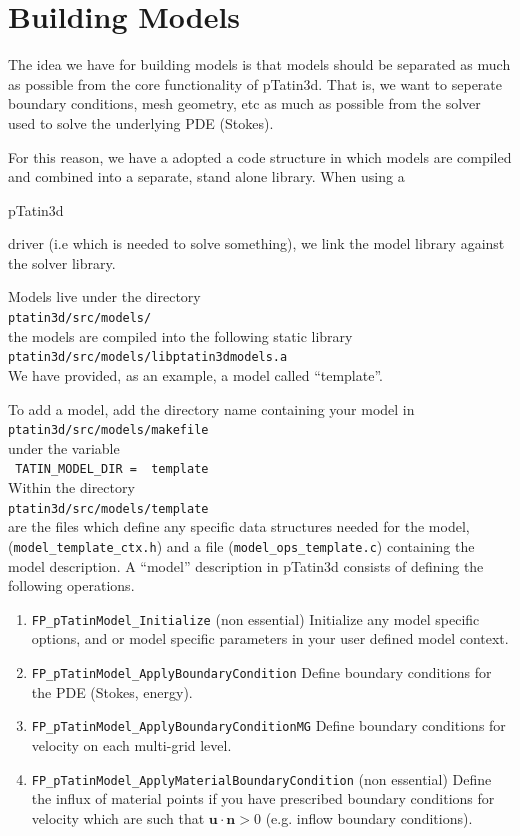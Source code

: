 \documentclass[paper=a4, fontsize=11pt,twoside]{scrartcl}
\newcommand{\ptat}{{pTatin3d}}
\newcommand{\shellcmd}[1]{\\\indent\indent\texttt{\hspace{5mm}\footnotesize #1}\\}
\newcommand{\unix}[1]{\texttt{\footnotesize #1}}
\begin{document}
\newpage
\section{Building Models}

The idea we have for building models is that models should be separated as much as possible
from the core functionality of {\ptat}. That is, we want to seperate boundary conditions,
mesh geometry, etc as much as possible from the solver used to solve the underlying PDE (Stokes).

For this reason, we have a adopted a code structure in which models are compiled and combined into
a separate, stand alone library. When using a {\ptat{ driver (i.e which is needed to solve something),
we link the model library against the solver library.

Models live under the directory
	\shellcmd{ptatin3d/src/models/}
the models are compiled into the following static library
	\shellcmd{ptatin3d/src/models/libptatin3dmodels.a}
	
We have provided, as an example, a model called ``template''.
	
To add a model, add the directory name containing your model in
	\shellcmd{ptatin3d/src/models/makefile}
under the variable
	\shellcmd{
	TATIN\_MODEL\_DIR = \
        template
	}
	
Within the directory
	\shellcmd{ptatin3d/src/models/template}
are the files which define any specific data structures needed for the model,
	(\unix{model\_template\_ctx.h})
and a file (\unix{model\_ops\_template.c}) containing the model description.
A ``model'' description in {\ptat} consists of defining the following operations.
\begin{enumerate}
	\item \unix{FP\_pTatinModel\_Initialize} (non essential)
	Initialize any model specific options, and or model specific parameters in your user defined model context.

	\item \unix{FP\_pTatinModel\_ApplyBoundaryCondition}
	Define boundary conditions for the PDE (Stokes, energy).

	\item \unix{FP\_pTatinModel\_ApplyBoundaryConditionMG}
	Define boundary conditions for velocity on each multi-grid level.

	\item \unix{FP\_pTatinModel\_ApplyMaterialBoundaryCondition} (non essential)
	Define the influx of material points if you have prescribed boundary conditions for velocity which are such that $\boldsymbol u \cdot \boldsymbol n > 0$ (e.g. inflow boundary conditions).


\end{enumerate}}}
\end{document}
